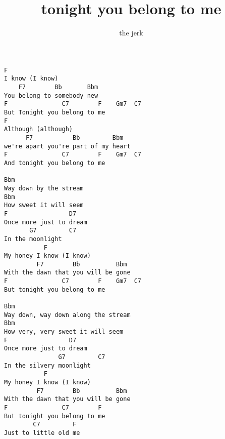 \author{the jerk}
\title{tonight you belong to me}
\maketitle
\begin{verbatim}
F
I know (I know)
    F7        Bb       Bbm
You belong to somebody new
F               C7        F    Gm7  C7
But Tonight you belong to me
F
Although (although) 
      F7           Bb         Bbm
we're apart you're part of my heart
F               C7        F    Gm7  C7
And tonight you belong to me

Bbm
Way down by the stream
Bbm
How sweet it will seem
F                 D7
Once more just to dream
       G7         C7
In the moonlight
           F
My honey I know (I know)
         F7        Bb          Bbm
With the dawn that you will be gone
F               C7        F    Gm7  C7
But tonight you belong to me

Bbm
Way down, way down along the stream
Bbm
How very, very sweet it will seem
F                 D7
Once more just to dream
               G7         C7
In the silvery moonlight
           F
My honey I know (I know)
         F7        Bb          Bbm
With the dawn that you will be gone
F               C7        F 
But tonight you belong to me
        C7         F
Just to little old me
\end{verbatim}
